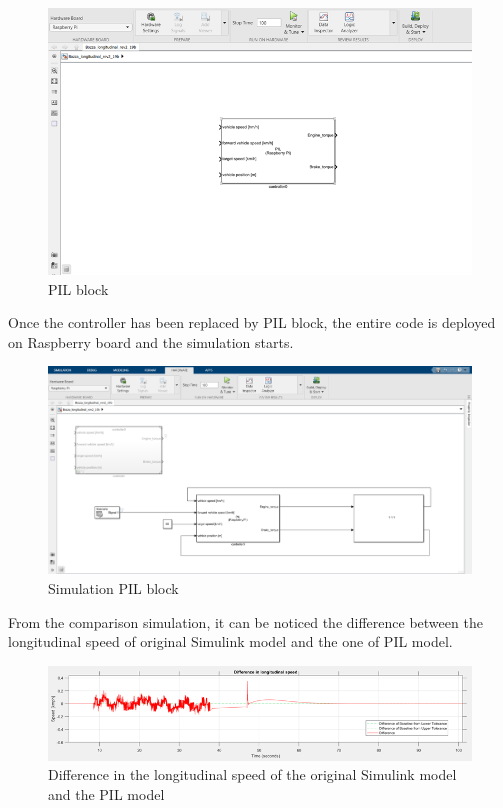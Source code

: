 \documentclass[12pt,a4paper]{report}
\begin{document}
\begin{figure}[htbp]
	\centering
	\includegraphics[scale=0.7]{PIL_block.png}
	\caption{PIL block}
\end{figure} \FloatBarrier
Once the controller has been replaced by PIL block, the entire code is deployed on Raspberry board and the simulation starts. 
\begin{figure}[htbp]
	\centering
	\includegraphics[scale=0.7]{PIL_sim.png}
	\caption{Simulation PIL block}
\end{figure} \FloatBarrier
From the comparison simulation, it can be noticed the difference between the longitudinal speed of original Simulink model and the one of PIL model.
\begin{figure}[htbp]
	\centering
	\includegraphics[scale=1]{plot_PIL.png}
	\caption{Difference in the longitudinal speed of the original Simulink model and the PIL model}
\end{figure} \FloatBarrier
\end{document}
